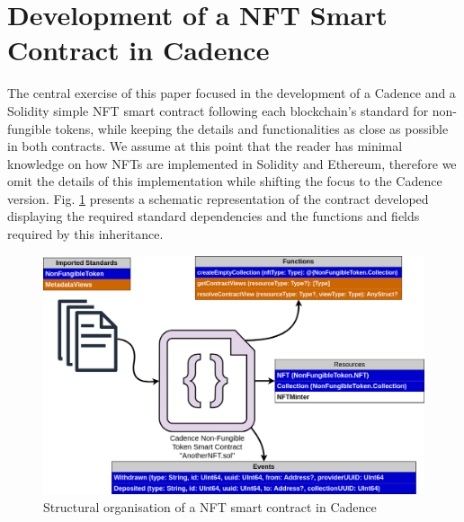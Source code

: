 \documentclass[../NFTComp_IEEE.tex]{subfiles}
\begin{document}
\section{Development of a NFT Smart Contract in Cadence}
\label{sec:cadence_development}
The central exercise of this paper focused in the development of a Cadence and a Solidity simple NFT smart contract following each blockchain's standard for non-fungible tokens, while keeping the details and functionalities as close as possible in both contracts. We assume at this point that the reader has minimal knowledge on how NFTs are implemented in Solidity and Ethereum, therefore we omit the details of this implementation while shifting the focus to the Cadence version. Fig. \ref{fig:cadence_nft_contract} presents a schematic representation of the contract developed displaying the required standard dependencies and the functions and fields required by this inheritance.

\begin{figure}[h!]
    \centering
    \includegraphics[width=\columnwidth]{Images/almei1.png}
    \caption{Structural organisation of a NFT smart contract in Cadence}
    \label{fig:cadence_nft_contract}
\end{figure}
\end{document}
